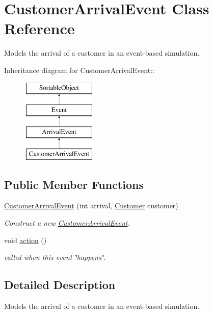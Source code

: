 \hypertarget{class_customer_arrival_event}{
\section{CustomerArrivalEvent Class Reference}
\label{class_customer_arrival_event}
}
Models the arrival of a customer in an event-based simulation.  


Inheritance diagram for CustomerArrivalEvent::\begin{figure}[H]
\begin{center}
\leavevmode
\includegraphics[height=4cm]{class_customer_arrival_event}
\end{center}
\end{figure}
\subsection*{Public Member Functions}
\begin{CompactItemize}
\item 
\hyperlink{class_customer_arrival_event_c9ca7779a23715f631b7764e047d270a}{CustomerArrivalEvent} (int arrival, \hyperlink{class_customer}{Customer} customer)
\begin{CompactList}\small\item\em Construct a new \hyperlink{class_customer_arrival_event}{CustomerArrivalEvent}. \item\end{CompactList}\item 
void \hyperlink{class_customer_arrival_event_70898c7fa4f92abf462e03b1cd76756b}{action} ()
\begin{CompactList}\small\item\em called when this event \char`\"{}happens\char`\"{}. \item\end{CompactList}\end{CompactItemize}


\subsection{Detailed Description}
Models the arrival of a customer in an event-based simulation. 

